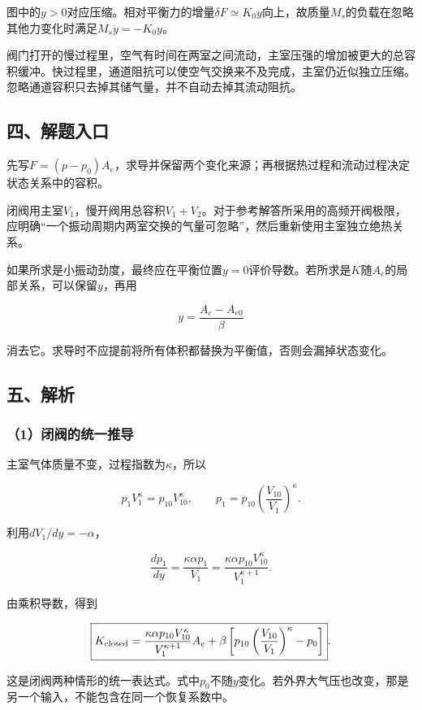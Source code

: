 \documentclass[12pt,a4paper,fontset=fandol]{ctexart}
\begin{document}
图中的\(y>0\)对应压缩。相对平衡力的增量\(\delta F\simeq K_0y\)向上，故质量\(M_s\)的负载在忽略其他力变化时满足\(M_s\ddot y=-K_0y\)。

阀门打开的慢过程里，空气有时间在两室之间流动，主室压强的增加被更大的总容积缓冲。快过程里，通道阻抗可以使空气交换来不及完成，主室仍近似独立压缩。忽略通道容积只去掉其储气量，并不自动去掉其流动阻抗。

\subsection{四、解题入口}\label{ux56dbux89e3ux9898ux5165ux53e3}

先写\(F=(p-p_0)A_e\)，求导并保留两个变化来源；再根据热过程和流动过程决定状态关系中的容积。

闭阀用主室\(V_1\)，慢开阀用总容积\(V_1+V_2\)。对于参考解答所采用的高频开阀极限，应明确``一个振动周期内两室交换的气量可忽略''，然后重新使用主室独立绝热关系。

如果所求是小振动劲度，最终应在平衡位置\(y=0\)评价导数。若所求是\(K\)随\(A_e\)的局部关系，可以保留\(y\)，再用

\[
y=\frac{A_e-A_{e0}}{\beta}
\]

消去它。求导时不应提前将所有体积都替换为平衡值，否则会漏掉状态变化。

\subsection{五、解析}\label{ux4e94ux89e3ux6790}

\subsubsection{（1）闭阀的统一推导}\label{ux95edux9600ux7684ux7edfux4e00ux63a8ux5bfc}

主室气体质量不变，过程指数为\(\kappa\)，所以

\[
p_1V_1^\kappa=p_{10}V_{10}^\kappa,
\qquad
p_1=p_{10}\left(\frac{V_{10}}{V_1}\right)^\kappa.
\]

利用\(dV_1/dy=-\alpha\)，

\[
\frac{dp_1}{dy}
=\frac{\kappa\alpha p_1}{V_1}
=\frac{\kappa\alpha p_{10}V_{10}^\kappa}
{V_1^{\kappa+1}}.
\]

由乘积导数，得到

\[
\boxed{
K_{\rm closed}
=\frac{\kappa\alpha p_{10}V_{10}^\kappa}
{V_1^{\kappa+1}}A_e
+\beta\left[
p_{10}\left(\frac{V_{10}}{V_1}\right)^\kappa-p_0
\right]}.
\]

这是闭阀两种情形的统一表达式。式中\(p_0\)不随\(y\)变化。若外界大气压也改变，那是另一个输入，不能包含在同一个恢复系数中。
\end{document}
